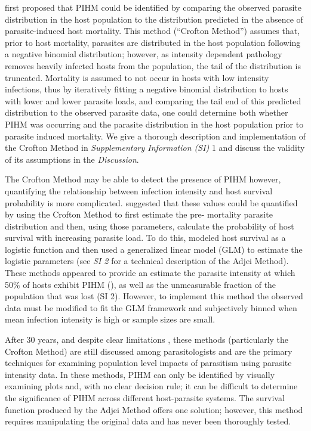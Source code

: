 \documentclass[12pt, a4paper]{article}
\begin{document}
\cite{Crofton1971a} first proposed that PIHM could be identified by comparing the
observed parasite distribution in the host population to the distribution
predicted in the absence of parasite-induced host mortality. This method
(“Crofton Method”) assumes that, prior to host mortality, parasites are
distributed in the host population following a negative binomial distribution;
however, as intensity dependent pathology removes heavily infected hosts from
the population, the tail of the distribution is truncated. Mortality is assumed
to not occur in hosts with low intensity infections, thus by iteratively
fitting a negative binomial distribution to hosts with lower and lower parasite
loads, and comparing the tail end of this predicted distribution to the
observed parasite data, one could determine both whether PIHM was occurring and
the parasite distribution in the host population prior to parasite induced
mortality. We give a thorough description and implementation of the Crofton
Method in \emph{Supplementary Information (SI)} 1 and discuss the validity of
its assumptions in the \emph{Discussion}.

The Crofton Method may be able to detect the presence of PIHM however,
quantifying the relationship between infection intensity and host survival
probability is more complicated. \cite{Adjei1986} suggested that these values
could be quantified by using the Crofton Method to first estimate the pre-
mortality parasite distribution and then, using those parameters, calculate the
probability of host survival with increasing parasite load. To do this,
\cite{Adjei1986} modeled host survival as a logistic function and then used a generalized linear model (GLM) to estimate the logistic parameters (see \emph{SI 2} for a technical description of the Adjei Method).
These methods appeared to provide an estimate the parasite intensity at which
50\% of hosts exhibit PIHM (), as well as the unmeasurable fraction of the
population that was lost (SI 2). However, to implement this method the observed data must be
modified to fit the GLM framework and subjectively binned when mean
infection intensity is high or sample sizes are small.

After 30 years, and despite clear limitations \citep{McCallum2000a}, these
methods (particularly the Crofton Method) are still discussed among
parasitologists and are the primary techniques for examining population level
impacts of parasitism using parasite intensity data. In these methods, PIHM can
only be identified by visually examining plots and, with no clear decision
rule; it can be difficult to determine the significance of PIHM across
different host-parasite systems. The survival function produced by the Adjei
Method offers one solution; however, this method requires manipulating the
original data and has never been thoroughly tested.
\end{document}

